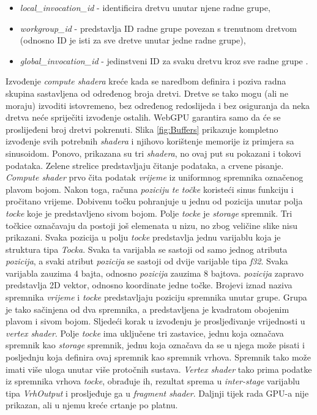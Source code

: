 \documentclass{foi}
\begin{document}
\begin{itemize}
	\item \textit{local\_invocation\_id} - identificira dretvu unutar njene radne grupe,
	\item \textit{workgroup\_id} - predstavlja ID radne grupe povezan s trenutnom dretvom (odnosno ID je isti za sve dretve unutar jedne radne grupe),
	\item \textit{global\_invocation\_id} - jedinstveni ID za svaku dretvu kroz sve radne grupe \parencite{WebGPUFundamentalsMemoryLayout}.
\end{itemize}
Izvođenje \textit{compute shadera} kreće kada se naredbom definira i poziva radna skupina sastavljena od određenog broja dretvi. Dretve se tako mogu (ali ne moraju) izvoditi istovremeno, bez određenog redoslijeda i bez osiguranja da neka dretva neće spriječiti izvođenje ostalih. WebGPU garantira samo da će se proslijeđeni broj dretvi pokrenuti. Slika \ref{fig:Buffers} prikazuje kompletno izvođenje svih potrebnih \textit{shadera} i njihovo korištenje memorije iz primjera sa sinusoidom. Ponovo, prikazana su tri \textit{shadera}, no ovaj put su pokazani i tokovi podataka. Zelene strelice predstavljaju čitanje podataka, a crvene pisanje. \textit{Compute shader} prvo čita podatak \textit{vrijeme} iz uniformnog spremnika označenog plavom bojom. Nakon toga, računa \textit{poziciju te točke} koristeći sinus funkciju i pročitano vrijeme. Dobivenu točku pohranjuje u jednu od pozicija unutar polja \textit{tocke} koje je predstavljeno sivom bojom. Polje \textit{tocke} je \textit{storage} spremnik. Tri točkice označavaju da postoji još elemenata u nizu, no zbog veličine slike nisu prikazani. Svaka pozicija u polju \textit{tocke} predstavlja jednu varijablu koja je struktura tipa \textit{Tocka}. Svaka ta varijabla se sastoji od samo jednog atributa \textit{pozicija}, a svaki atribut \textit{pozicija} se sastoji od dvije varijable tipa \textit{f32}. Svaka varijabla zauzima 4 bajta, odnosno \textit{pozicija} zauzima 8 bajtova. \textit{pozicija} zapravo predstavlja 2D vektor, odnosno koordinate jedne točke. Brojevi iznad naziva spremnika \textit{vrijeme} i \textit{tocke} predstavljaju poziciju spremnika unutar grupe. Grupa je tako sačinjena od dva spremnika, a predstavljena je kvadratom obojenim plavom i sivom bojom. Sljedeći korak u izvođenju je prosljeđivanje vrijednosti u \textit{vertex shader}. Polje \textit{tocke} ima uključene tri zastavice, jednu koja označava spremnik kao \textit{storage} spremnik, jednu koja označava da se u njega može pisati i posljednju koja definira ovaj spremnik kao spremnik vrhova. Spremnik tako može imati više uloga unutar više protočnih sustava. \textit{Vertex shader} tako prima podatke iz spremnika vrhova \textit{tocke}, obrađuje ih, rezultat sprema u \textit{inter-stage} varijablu tipa \textit{VrhOutput} i prosljeđuje ga u \textit{fragment shader}. Daljnji tijek rada GPU-a nije prikazan, ali u njemu kreće crtanje po platnu.
\end{document}
